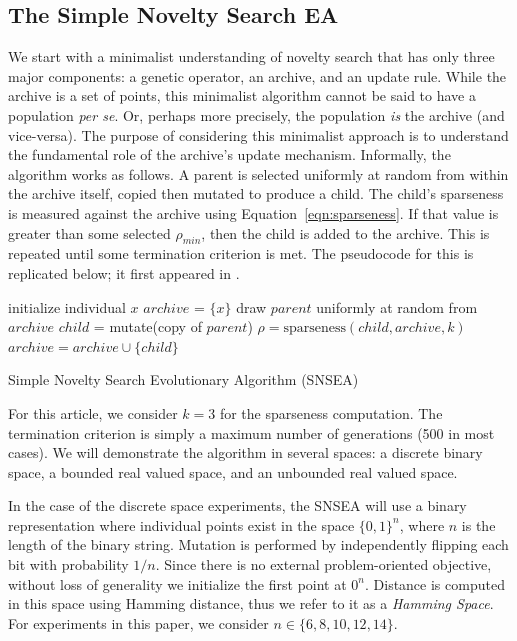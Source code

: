 \documentclass[twoside]{article}
\begin{document}
\subsection{The Simple Novelty Search EA}
\label{subsec:sns}

We start with a minimalist understanding of novelty search that has only three major components: a genetic operator, an archive, and an update rule.  While the archive is a set of points, this minimalist algorithm cannot be said to have a population \textit{per se}.  Or, perhaps more precisely, the population \emph{is} the archive (and vice-versa).  The purpose of considering this minimalist approach is to understand the fundamental role of the archive's update mechanism.  Informally, the algorithm works as follows.  A parent is selected uniformly at random from within the archive itself, copied then mutated to produce a child.  The child's sparseness is measured against the archive using Equation~\ref{eqn:sparseness}.  If that value is greater than some selected $\rho_{min}$, then the child is added to the archive.  This is repeated until some termination criterion is met.  The pseudocode for this is replicated below; it first appeared in \citet{Wiegand2020flairs}.

\begin{algorithm}[h]
  \SetAlgoLined
  \DontPrintSemicolon 
  
  \;
    
  initialize individual $x$\;
  $archive$ = $\{x\}$\;
   {
    draw $parent$ uniformly at random from $archive$\;
    $child$ = mutate(copy of $parent$)\;
    $\rho = \mbox{sparseness}(child, archive, k)$\;
     {
      $archive = archive \cup \{child\}$\;
     }
  }
  \caption{Simple Novelty Search Evolutionary Algorithm (SNSEA)}
\end{algorithm}

For this article, we consider $k=3$ for the sparseness computation.  The termination criterion is simply a maximum number of generations (500 in most cases).  We will demonstrate the algorithm in several spaces: a discrete binary space, a bounded real valued space, and an unbounded real valued space.  

In the case of the discrete space experiments, the SNSEA will use a binary representation where individual points exist in the space $\{0,1\}^n$, where $n$ is the length of the binary string.  Mutation is performed by independently flipping each bit with probability $1/n$.  Since there is no external problem-oriented objective, without loss of generality we initialize the first point at $0^n$.  Distance is computed in this space using Hamming distance, thus we refer to it as a \emph{Hamming Space}.  For experiments in this paper, we consider $n\in\{6,8,10,12,14\}$.
\end{document}
